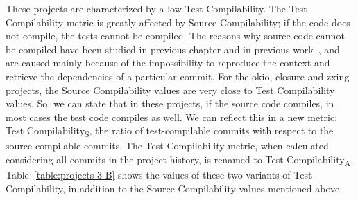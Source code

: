 These projects are characterized by a low Test Compilability. 
The Test Compilability metric is greatly affected by Source Compilability; if the code does not compile, the tests cannot be compiled. 
The reasons why source code cannot be compiled have been studied in previous chapter and in previous work~\cite{tufano2017there,Sulir:2016:QSJ:3001878.3001882}, and are caused mainly because of the impossibility to reproduce the context and retrieve the dependencies of a particular commit. 
For the okio, closure and zxing projects, the Source Compilability values are very close to Test Compilability values.
So, we can state that in these projects, if the source code compiles, in most cases the test code compiles as well. 
We can reflect this in a new metric: Test Compilability\textsubscript{S}, the ratio of test-compilable commits with respect to the source-compilable commits.
The Test Compilability metric, when calculated considering all commits in the project history, is renamed to Test Compilability\textsubscript{A}.
Table~\ref{table:projects-3-B} shows the values of these two variants of Test Compilability, in addition to the Source Compilability values mentioned above.


